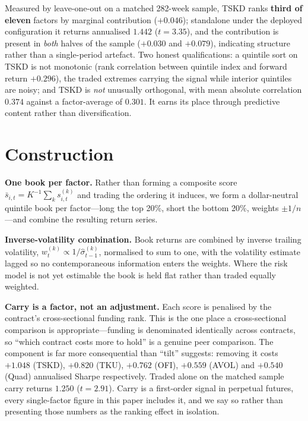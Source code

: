 \documentclass[11pt,letterpaper]{article}
\begin{document}
Measured by leave-one-out on a matched 282-week sample, TSKD ranks \textbf{third
of eleven} factors by marginal contribution ($+0.046$); standalone under the
deployed configuration it returns annualised $1.442$ ($t = 3.35$), and the
contribution is present in \emph{both} halves of the sample ($+0.030$ and
$+0.079$), indicating structure rather than a single-period artefact. Two honest
qualifications: a quintile sort on TSKD is not monotonic (rank correlation
between quintile index and forward return $+0.296$), the traded extremes carrying
the signal while interior quintiles are noisy; and TSKD is \emph{not} unusually
orthogonal, with mean absolute correlation $0.374$ against a factor-average of
$0.301$. It earns its place through predictive content rather than
diversification.

\section{Construction}

\textbf{One book per factor.} Rather than forming a composite score
$\bar{s}_{i,t} = K^{-1}\sum_k s^{(k)}_{i,t}$ and trading the ordering it
induces, we form a dollar-neutral quintile book per factor---long the top 20\%,
short the bottom 20\%, weights $\pm 1/n$---and combine the resulting return
series.

\textbf{Inverse-volatility combination.} Book returns are combined by inverse
trailing volatility, $w^{(k)}_t \propto 1/\hat\sigma^{(k)}_{t-1}$, normalised to
sum to one, with the volatility estimate lagged so no contemporaneous
information enters the weights. Where the risk model is not yet estimable the
book is held flat rather than traded equally weighted.

\textbf{Carry is a factor, not an adjustment.} Each score is penalised by the
contract's cross-sectional funding rank. This is the one place a cross-sectional
comparison is appropriate---funding is denominated identically across contracts,
so ``which contract costs more to hold'' is a genuine peer comparison. The
component is far more consequential than ``tilt'' suggests: removing it costs
$+1.048$ (TSKD), $+0.820$ (TKU), $+0.762$ (OFI), $+0.559$ (AVOL) and $+0.540$
(Quad) annualised Sharpe respectively. Traded alone on the matched sample carry
returns $1.250$ ($t = 2.91$). Carry is a first-order signal in perpetual futures,
every single-factor figure in this paper includes it, and we say so rather than
presenting those numbers as the ranking effect in isolation.
\end{document}
